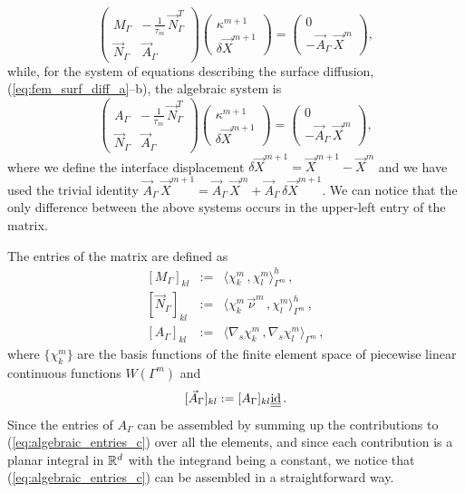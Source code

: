 \begin{equation}\label{eq:algebraic_mean_curvature}
\begin{pmatrix}
M_\Gamma & -\,\frac{1}{\tau_m} \, \vec N_\Gamma^T \\
\vec N_\Gamma & \vec A_\Gamma
\end{pmatrix}
\begin{pmatrix}
\kappa^{m + 1} \\
\delta \vec X^{m + 1}
\end{pmatrix}
=
\begin{pmatrix}
0 \\
- \vec A_\Gamma \, \vec X^m
\end{pmatrix} ,
\end{equation}
while, for the system of equations describing the surface diffusion,
(\ref{eq:fem_surf_diff_a}--b), the algebraic system is
\begin{equation}\label{eq:algebraic_surf_diff}
\begin{pmatrix}
A_\Gamma & - \,\frac{1}{\tau_m}\, \vec N_\Gamma^T \\
\vec N_\Gamma & \vec A_\Gamma
\end{pmatrix}
\begin{pmatrix}
\kappa^{m + 1} \\
\delta \vec X^{m + 1}
\end{pmatrix}
=
\begin{pmatrix}
0 \\
- \vec A_\Gamma \, \vec X^m
\end{pmatrix},
\end{equation}
where we define the interface displacement $\delta \vec X^{m + 1}=\vec X^{m +
1} - \vec X^m$ and we have used the trivial identity $\vec A_\Gamma\,\vec
X^{m+1} = \vec A_\Gamma\,\vec X^m + \vec A_\Gamma\,\delta \vec X^{m+1}$. We can
notice that the only difference between the above systems occurs in the
upper-left entry of the matrix.

The entries of the matrix are defined as
\begin{eqnarray}
\left[ M_\Gamma \right]_{kl} & := & \langle \chi_k^m \, , \chi_l^m
\rangle_{\Gamma^m}^h\,,\label{eq:algebraic_entries_a} \\
\left[ \vec N_\Gamma \right]_{kl} & := & \langle \chi_k^m \, \vec \nu^m\,,
\chi_l^m \rangle_{\Gamma^m}^h\,,\label{eq:algebraic_entries_b} \\
\left[ A_\Gamma \right]_{kl} & := & \langle \nabla_s \chi_k^m \, , \nabla_s
\chi_l^m \rangle_{\Gamma^m}\,,\label{eq:algebraic_entries_c}
\end{eqnarray}
where $\{\chi_k^m\}$ are the basis functions of the finite element space of
piecewise linear continuous functions $W(\Gamma^m)$ and
\begin{equation}\label{eq:algebraic_entries_d}
[\vec A_\Gamma]_{kl} := [A_\Gamma]_{kl} \mat \id\,.
\end{equation}
Since the entries of $A_\Gamma$ can be assembled by summing up the contributions
to (\ref{eq:algebraic_entries_c}) over all the elements, and since each
contribution is a planar integral in $\mathbb R^d$ with the integrand being a
constant, we notice that (\ref{eq:algebraic_entries_c}) can be assembled in a
straightforward way.

